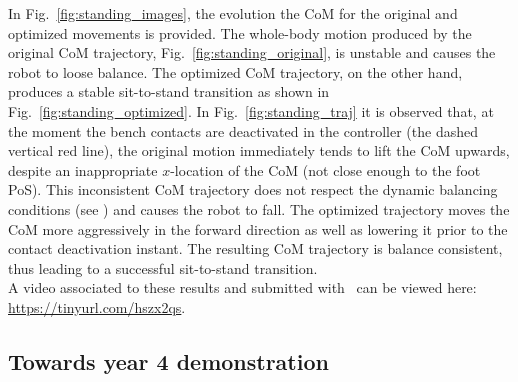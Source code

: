 \documentclass[12pt,a4paper,twoside]{article}
\begin{document}
In Fig.~\ref{fig:standing_images},  the evolution the CoM for the original and optimized movements is provided. The whole-body motion produced by the original CoM trajectory, Fig.~\ref{fig:standing_original}, is unstable and causes the robot to loose balance. The optimized CoM trajectory, on the other hand, produces a stable sit-to-stand transition as shown in Fig.~\ref{fig:standing_optimized}. In Fig.~\ref{fig:standing_traj} it is observed that, at the moment the bench contacts are deactivated in the controller (the dashed vertical red line), the original motion immediately tends to lift the CoM upwards, despite an inappropriate $x$-location of the CoM (not close enough to the foot PoS). This inconsistent CoM trajectory does not respect the dynamic balancing conditions (see \cite{Perrin2015}) and causes the robot to fall.%
The optimized trajectory moves the CoM more aggressively in the forward direction as well as lowering it prior to the contact deactivation instant. The resulting CoM trajectory is balance consistent, thus leading to a successful sit-to-stand transition.\\

A video associated to these results and submitted with~\cite{lober2017RAL-IROS} can be viewed here: \url{https://tinyurl.com/hszx2qs}.

\subsection{Towards year 4 demonstration}
\end{document}
